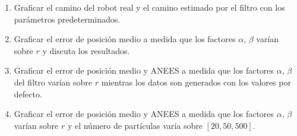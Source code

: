 \documentclass[tp]{lcc}
\begin{document}
	\begin{enumerate}
		\item Graficar el camino del robot real y el camino estimado por el filtro con los parámetros predeterminados.
		\item Graficar el error de posición medio a medida que los factores $\alpha$, $\beta$ varían sobre $r$ y discuta los resultados.
		\item Graficar el error de posición medio y ANEES a medida que los factores $\alpha$, $\beta$ del filtro varían sobre $r$ mientras los datos son generados con los valores por defecto.
		\item Graficar el error de posición medio y ANEES a medida que los factores $\alpha$, $\beta$ varían sobre $r$ y el número de partículas varía sobre $[20, 50, 500]$.
	\end{enumerate}


	\printbibliography
	
\end{document}
